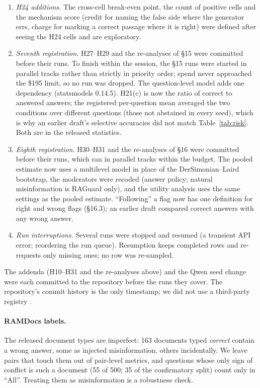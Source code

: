 \begin{enumerate}[leftmargin=*,itemsep=1pt,topsep=2pt]
\item \emph{H24 additions.} The cross-cell break-even point, the count of positive cells and the mechanism score
(credit for naming the false side where the generator errs, charge for marking a correct passage where it is right)
were defined after seeing the H24 cells and are exploratory.
\item \emph{Seventh registration.} H27--H29 and the re-analyses of \S15 were committed before their runs. To finish
within the session, the \S15 runs were started in parallel tracks rather than strictly in priority order; spend never
approached the \$195 limit, so no run was dropped. The question-level model adds one dependency (statsmodels 0.14.5).
H21(c) is now the ratio of correct to answered answers; the registered per-question mean averaged the two conditions
over different questions (those not abstained in every seed), which is why an earlier draft's selective accuracies did
not match Table~\ref{tab:risk}. Both are in the released statistics.
\item \emph{Eighth registration.} H30--H31 and the re-analyses of \S16 were committed before their runs, which
ran in parallel tracks within the budget. The pooled estimate now uses a multilevel model in place of the
DerSimonian--Laird bootstrap, the moderators were recoded (answer policy; natural misinformation is RAGuard only), and
the utility analysis uses the same settings as the pooled estimate. ``Following'' a flag now has one definition for
right and wrong flags (\S16.3); an earlier draft compared correct answers with any wrong answer.
\item \emph{Run interruptions.} Several runs were stopped and resumed (a transient API error; reordering the run
queue). Resumption keeps completed rows and re-requests only missing ones; no row was re-sampled.
\end{enumerate}
The addenda (H10--H31 and the re-analyses above) and the Qwen seed change were each committed to the repository before
the runs they cover. The repository's commit history is the only timestamp; we did not use a third-party registry
\citep{vanmiltenburg2021preregistering}.

\paragraph{RAMDocs labels.} The released document types are imperfect: 163 documents typed \emph{correct} contain a
wrong answer, some as injected misinformation, others incidentally. We leave pairs that touch them out of pair-level
metrics, and questions whose only sign of conflict is such a document (55 of 500; 35 of the confirmatory split) count
only in ``All''. Treating them as misinformation is a robustness check.

